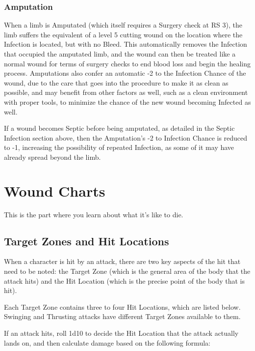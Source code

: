 \documentclass[oneside,11pt,english]{book}
\begin{document}
\subsection{Amputation}
When a limb is Amputated (which itself requires a Surgery check at RS 3), the limb suffers the equivalent 
of a level 5 cutting wound on the location where the Infection is located, but with no Bleed. This 
automatically removes the Infection that occupied the amputated limb, and the wound can then be treated 
like a normal wound for terms of surgery checks to end blood loss and begin the healing process. 
Amputations also confer an automatic -2 to the Infection Chance of the wound, due to the care that goes 
into the procedure to make it as clean as possible, and may benefit from other factors as well, such as a 
clean environment with proper tools, to minimize the chance of the new wound becoming Infected as 
well.

If a wound becomes Septic before being amputated, as detailed in the Septic Infection section above, then 
the Amputation’s -2 to Infection Chance is reduced to -1, increasing the possibility of repeated Infection, 
as some of it may have already spread beyond the limb. 

\chapter{Wound Charts}\label{ch:Damage Tables}
\startcontents[chapters]
\clearpage
\begin{center}
	This is the part where you learn about what it’s like to die.
\end{center}

\section{Target Zones and Hit Locations}
When a character is hit by an attack, there are two key aspects of the hit that need to be noted: the Target 
Zone (which is the general area of the body that the attack hits) and the Hit Location (which is the precise 
point of the body that is hit). 

Each Target Zone contains three to four Hit Locations, which are listed below. Swinging and Thrusting 
attacks have different Target Zones available to them.  

If an attack hits, roll 1d10 to decide the Hit Location that the attack actually lands on, and then calculate 
damage based on the following formula: 
\end{document}
